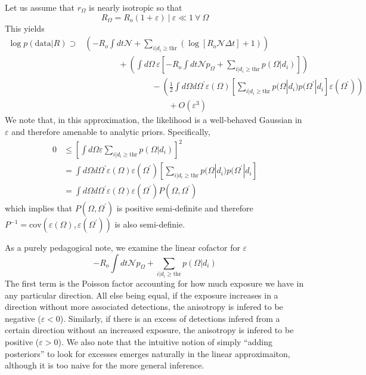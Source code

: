 \documentclass{article}
\begin{document}
Let us assume that $r_\Omega$ is nearly isotropic so that 
\begin{equation}
    \left. R_\Omega = R_o\left(1+\varepsilon\right) \ \right| \ \varepsilon \ll 1 \ \forall \ \Omega
\end{equation}
This yields
\begin{align}
    \log p(\mathrm{data}|R) \supset & \left( - R_o \int dt \mathcal{N} + \sum\limits_{i|d_i\geq\mathrm{thr}} \left( \log\left[ R_o \mathcal{N} \Delta t \right] + 1 \right) \right) \nonumber \\
                                    & \quad \quad \quad \quad + \left( \int d\Omega\, \varepsilon \left[ - R_o \int dt \mathcal{N} p_\Omega + \sum\limits_{i|d_i\geq\mathrm{thr}} p(\Omega|d_i) \right] \right) \nonumber \\
                                    & \quad \quad \quad \quad \quad \quad \quad \quad - \left( \frac{1}{2}\int d\Omega d\Omega^\prime \varepsilon(\Omega) \left[ \sum\limits_{i|d_i\geq\mathrm{thr}} p(\Omega|d_i) p(\Omega^\prime|d_i \right] \varepsilon(\Omega^\prime) \right) \nonumber \\
                                    & \quad \quad \quad \quad \quad \quad \quad \quad \quad \quad + O\left(\varepsilon^3\right)
\end{align}
We note that, in this approximation, the likelihood is a well-behaved Gaussian in $\varepsilon$ and therefore amenable to analytic priors.
Specifically,
\begin{align}
    0 & \leq \left[\int d\Omega \varepsilon \sum\limits_{i|d_i\geq\mathrm{thr}} p(\Omega|d_i)\right]^2 \nonumber \\
      & = \int d\Omega d\Omega^\prime \varepsilon(\Omega) \varepsilon(\Omega^\prime) \left[ \sum\limits_{i|d_i\geq\mathrm{thr}} p(\Omega|d_i) p(\Omega^\prime|d_i \right] \\
      & = \int d\Omega d\Omega^\prime \varepsilon(\Omega) \varepsilon(\Omega^\prime) P(\Omega, \Omega^\prime)
\end{align}
which implies that $P(\Omega, \Omega^\prime)$ is positive semi-definite and therefore $P^{-1} = \mathrm{cov}\left(\varepsilon(\Omega), \varepsilon(\Omega^\prime)\right)$ is also semi-definie.

As a purely pedagogical note, we examine the linear cofactor for $\varepsilon$
\begin{equation}\label{eq:linear cofactor}
    -R_o \int dt \mathcal{N} p_\Omega + \sum\limits_{i|d_i\geq\mathrm{thr}} p(\Omega|d_i)
\end{equation}
The first term is the Poisson factor accounting for how much exposure we have in any particular direction. 
All else being equal, if the exposure increases in a direction without more associated detections, the anisotropy is infered to be negative ($\varepsilon < 0$). 
Similarly, if there is an excess of detections infered from a certain direction without an increased exposure, the anisotropy is infered to be positive ($\varepsilon > 0$).
We also note that the intuitive notion of simply ``adding posteriors'' to look for excesses emerges naturally in the linear approximaiton, although it is too naive for the more general inference.
\end{document}
